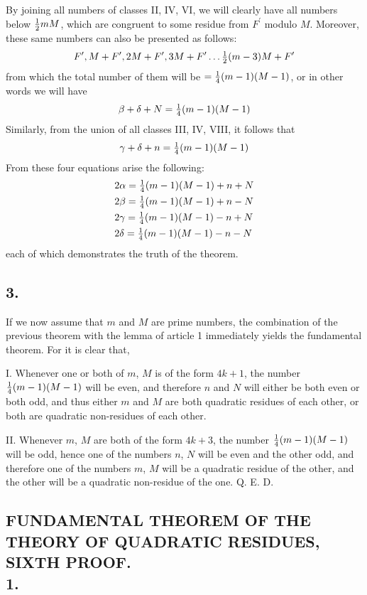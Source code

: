 \documentclass[twoside,12pt]{memoir}
\let\oldfrac\frac
\def\frac#1#2{\mathchoice{\tfrac{#1}{#2}}{\oldfrac{#1}{#2}}{\genfrac{}{}{}{2}{#1}{#2\mathstrut}}{\genfrac{}{}{}{3}{#1}{#2\mathstrut}}}
\begin{document}
By joining all numbers of classes II, IV, VI, we will clearly have all numbers below \(\frac{1}{2} m M\), which are congruent to some residue from \(F^{\prime}\) modulo \(M\).  Moreover, these same numbers can also be presented as follows:
\[F^{\prime}, M+F^{\prime}, 2 M+F^{\prime}, 3 M+F^{\prime}  \ldots \frac{1}{2}(m-3) M+F^{\prime}\]
from which the total number of them will be \(=\frac{1}{4}(m-1)(M-1)\), or in other words we will have
\[ \beta+\delta+N=\frac{1}{4}(m-1)(M-1) \]
Similarly, from the union of all classes III, IV, VIII, it follows that
\[ \gamma+\delta+n=\frac{1}{4}(m-1)(M-1) \]
From these four equations arise the following:
\[\begin{aligned}
&2 \alpha=\frac{1}{4}(m-1)(M-1)+n+N  \\
&2 \beta=\frac{1}{4}(m-1)(M-1)+n-N  \\
&2 \gamma=\frac{1}{4}(m-1)(M-1)-n+N  \\
&2 \delta=\frac{1}{4}(m-1)(M-1)-n-N  
\end{aligned}\]
each of which demonstrates the truth of the theorem. 
%

\subsection*{3.}
 
If we now assume that \(m\) and \(M\) are prime numbers, the combination of the previous theorem with the lemma of article 1 immediately yields the fundamental theorem. For it is clear that,
 
I. Whenever one or both of \(m\), \(M\) is of the form \(4k+1\), the number \(\frac{1}{4}(m-1)(M-1)\) will be even, and therefore \(n\) and \(N\) will either be both even or both odd, and thus either \(m\) and \(M\) are both quadratic residues of each other, or both are quadratic non-residues of each other. 
 
II. Whenever \(m\), \(M\) are both of the form \(4k+3\), the number \(\frac{1}{4}(m-1)(M-1)\) will be odd, hence one of the numbers \(n\), \(N\) will be even and the other odd, and therefore one of the numbers \(m\), \(M\) will be a quadratic residue of the other, and the other will be a quadratic non-residue of the one. Q. E. D.
%

\subsection*{{\scriptsize FUNDAMENTAL THEOREM OF THE THEORY OF QUADRATIC RESIDUES, SIXTH PROOF.}\\
1.}
 
\end{document}
